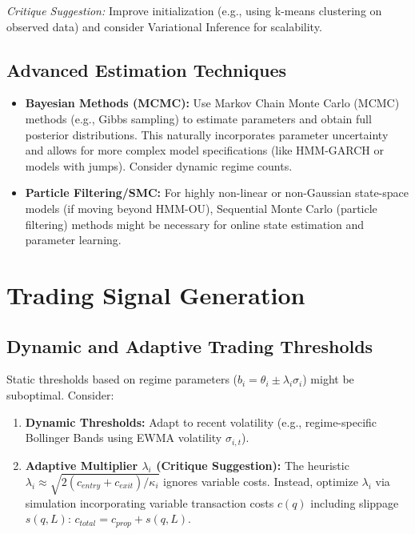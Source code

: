 \documentclass{article}
\begin{document}
\textit{Critique Suggestion:} Improve initialization (e.g., using k-means clustering on observed data) and consider Variational Inference for scalability.

\subsection{Advanced Estimation Techniques}

\begin{itemize}
    \item \textbf{Bayesian Methods (MCMC):} Use Markov Chain Monte Carlo (MCMC) methods (e.g., Gibbs sampling) to estimate parameters and obtain full posterior distributions. This naturally incorporates parameter uncertainty and allows for more complex model specifications (like HMM-GARCH or models with jumps). Consider dynamic regime counts.
    \item \textbf{Particle Filtering/SMC:} For highly non-linear or non-Gaussian state-space models (if moving beyond HMM-OU), Sequential Monte Carlo (particle filtering) methods might be necessary for online state estimation and parameter learning.
\end{itemize}

\section{Trading Signal Generation}

\subsection{Dynamic and Adaptive Trading Thresholds}

Static thresholds based on regime parameters ($b_i = \theta_i \pm \lambda_i \sigma_i$) might be suboptimal. Consider:

\begin{enumerate}
    \item \textbf{Dynamic Thresholds:} Adapt to recent volatility (e.g., regime-specific Bollinger Bands using EWMA volatility $\sigma_{i,t}$).
    \item \textbf{Adaptive Multiplier $\lambda_i$ (Critique Suggestion):} The heuristic $\lambda_i \approx \sqrt{2(c_{entry} + c_{exit})/\kappa_i}$ ignores variable costs. Instead, optimize $\lambda_i$ via simulation incorporating variable transaction costs $c(q)$ including slippage $s(q,L)$: $c_{total} = c_{prop} + s(q,L)$.
\end{enumerate}
\end{document}
